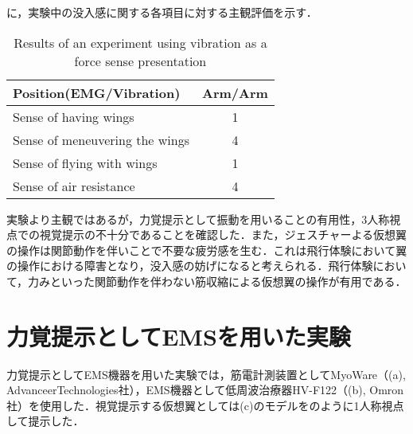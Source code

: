     に，実験中の没入感に関する各項目に対する主観評価を示す．
        \begin{table}[h]
            \begin{center}
                \caption{Results of an experiment using vibration as a force sense presentation}
                \scalebox{0.75}
                {
                    \begin{tabular}{l|c}
                        \hline
                        Position(EMG/Vibration) & Arm/Arm \\\hline
                        Sense of having wings & 1 \\
                        Sense of meneuvering the wings & 4 \\
                        Sense of flying with wings & 1 \\
                        Sense of air resistance & 4 \\\hline
                    \end{tabular}
                }
            \end{center}
        \end{table}
    

    実験より主観ではあるが，力覚提示として振動を用いることの有用性，3人称視点での視覚提示の不十分であることを確認した．また，ジェスチャーよる仮想翼の操作は関節動作を伴いことで不要な疲労感を生む．これは飛行体験において翼の操作における障害となり，没入感の妨げになると考えられる．飛行体験において，力みといった関節動作を伴わない筋収縮による仮想翼の操作が有用である．

    \section{力覚提示としてEMSを用いた実験}


    力覚提示としてEMS機器を用いた実験では，筋電計測装置としてMyoWare（(a), AdvanceerTechnologies社），EMS機器として低周波治療器HV-F122（(b), Omron社）を使用した．視覚提示する仮想翼としては(c)のモデルをのように1人称視点して提示した．

